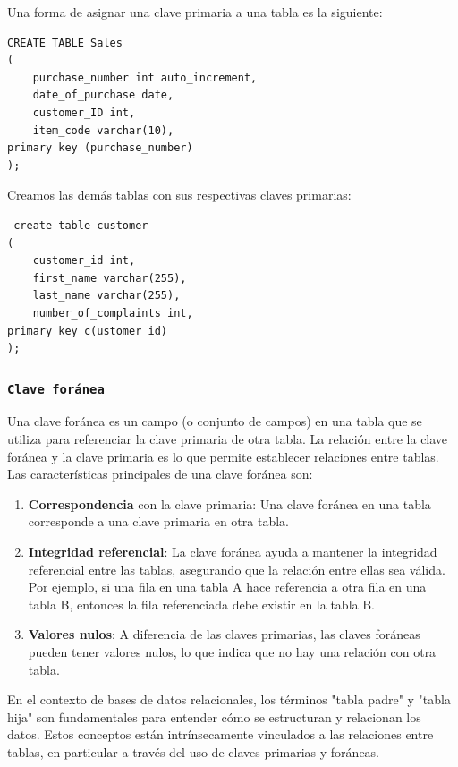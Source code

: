  Una forma de asignar una clave primaria a una tabla es la siguiente:

\begin{verbatim}
CREATE TABLE Sales
(
	purchase_number int auto_increment,
	date_of_purchase date,
    customer_ID int,
    item_code varchar(10),
primary key (purchase_number)
);
\end{verbatim}
 
 
 Creamos las demás tablas con sus respectivas claves primarias:
 
 \begin{verbatim}
 create table customer
(
	customer_id int,
    first_name varchar(255),
    last_name varchar(255),
    number_of_complaints int,
primary key c(ustomer_id)
);
 \end{verbatim}
\subsubsection{\texttt{Clave foránea}}

Una clave foránea es un campo (o conjunto de campos) en una tabla que se utiliza para referenciar la clave primaria de otra tabla. La relación entre la clave foránea y la clave primaria es lo que permite establecer relaciones entre tablas. Las características principales de una clave foránea son: 

\begin{enumerate}
    \item \textbf{Correspondencia} con la clave primaria: Una clave foránea en una tabla corresponde a una clave primaria en otra tabla.
    \item \textbf{Integridad referencial}: La clave foránea ayuda a mantener la integridad referencial entre las tablas, asegurando que la relación entre ellas sea válida. Por ejemplo, si una fila en una tabla A hace referencia a otra fila en una tabla B, entonces la fila referenciada debe existir en la tabla B.
    \item \textbf{Valores nulos}: A diferencia de las claves primarias, las claves foráneas pueden tener valores nulos, lo que indica que no hay una relación con otra tabla.
\end{enumerate}

En el contexto de bases de datos relacionales, los términos "tabla padre" y "tabla hija" son fundamentales para entender cómo se estructuran y relacionan los datos. Estos conceptos están intrínsecamente vinculados a las relaciones entre tablas, en particular a través del uso de claves primarias y foráneas.


